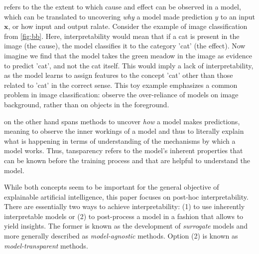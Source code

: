  refers to the the extent to which cause and effect can be observed in a model, which can be translated to uncovering \textit{why} a model made prediction $y$ to an input $\mathbf{x}$, or how input and output ralate. Consider the example of image classification from \autoref{fig:bb}. Here, interpretability would mean that if a cat is present in the image (the cause), the model classifies it to the category 'cat' (the effect). Now imagine we find that the model takes the green meadow in the image as evidence to predict 'cat', and not the cat itself. This would imply a lack of interpretability, as the model learns to assign features to the concept 'cat' other than those related to 'cat' in the correct sense. This toy example emphasizes a common problem in image classification: \cite{xiao2020noise} observe the over-reliance of models on image background, rather than on objects in the foreground. %

 on the other hand spans methods to uncover \textit{how} a model makes predictions, meaning to observe the inner workings of a model and thus to literally explain what is happening in terms of understanding of the mechanisms by which a model works. Thus, tansparency refers to the model's inherent properties that can be known before the training process and that are helpful to understand the model.

\par\smallskip
While both concepts seem to be important for the general objective of explainable artificial intelligence, this paper focuses on post-hoc interpretability.
There are essentially two ways to achieve interpretability: (1) to use inherently interpretable models or (2) to post-process a model in a fashion that allows to yield insights. The former is known as the development of \textit{surrogate} models and more generally described as \textit{model-agnostic} methods. Option (2) is known as \textit{model-transparent} methods. 

